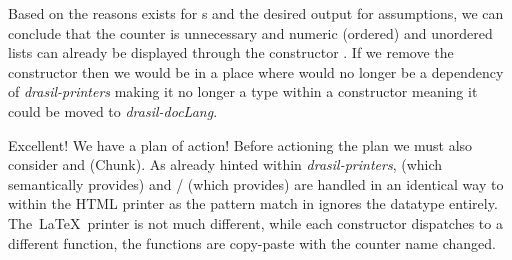 Based on the reasons  exists for s and the desired output for assumptions, we can conclude that the counter is unnecessary and numeric (ordered) and unordered lists can already be displayed through the  constructor . If we remove the  constructor then we would be in a place where  would no longer be a dependency of \textit{drasil-printers} making it no longer a type within a  constructor meaning it could be moved to \textit{drasil-docLang}.

%
%
%

Excellent! We have a plan of action! Before actioning the plan we must also consider  and  (Chunk). As already hinted within \textit{drasil-printers},  (which  semantically provides) and / (which  provides) are handled in an identical way to  within the HTML printer as the pattern match in  ignores the  datatype entirely. The\ \LaTeX\ printer is not much different, while each  constructor dispatches to a different function, the functions are copy-paste with the counter name changed. %

